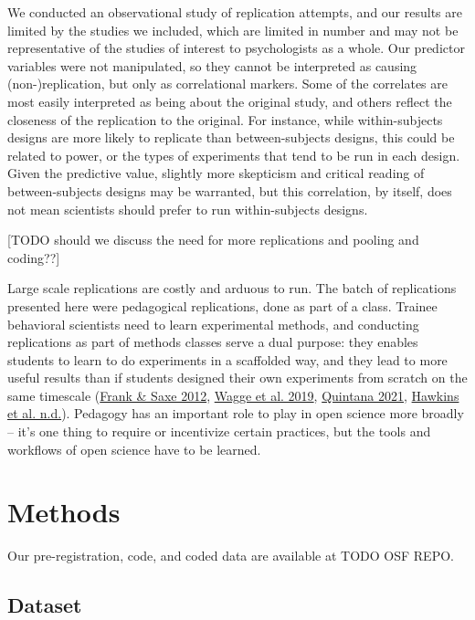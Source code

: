 \documentclass[
  english,
  a4paper,
]{article}
\begin{document}
We conducted an observational study of replication attempts, and our results are limited by the studies we included, which are limited in number and may not be representative of the studies of interest to psychologists as a whole. Our predictor variables were not manipulated, so they cannot be interpreted as causing (non-)replication, but only as correlational markers. Some of the correlates are most easily interpreted as being about the original study, and others reflect the closeness of the replication to the original. For instance, while within-subjects designs are more likely to replicate than between-subjects designs, this could be related to power, or the types of experiments that tend to be run in each design. Given the predictive value, slightly more skepticism and critical reading of between-subjects designs may be warranted, but this correlation, by itself, does not mean scientists should prefer to run within-subjects designs.

{[}TODO should we discuss the need for more replications and pooling and coding??{]}

Large scale replications are costly and arduous to run. The batch of replications presented here were pedagogical replications, done as part of a class. Trainee behavioral scientists need to learn experimental methods, and conducting replications as part of methods classes serve a dual purpose: they enables students to learn to do experiments in a scaffolded way, and they lead to more useful results than if students designed their own experiments from scratch on the same timescale (\protect\hyperlink{ref-frank2012}{Frank \& Saxe 2012}, \protect\hyperlink{ref-wagge2019}{Wagge et al. 2019}, \protect\hyperlink{ref-quintana2021}{Quintana 2021}, \protect\hyperlink{ref-hawkins}{Hawkins et al. n.d.}). Pedagogy has an important role to play in open science more broadly -- it's one thing to require or incentivize certain practices, but the tools and workflows of open science have to be learned.

\hypertarget{methods}{%
\section{Methods}\label{methods}}

Our pre-registration, code, and coded data are available at TODO OSF REPO.

\hypertarget{dataset}{%
\subsection{Dataset}\label{dataset}}
\end{document}
